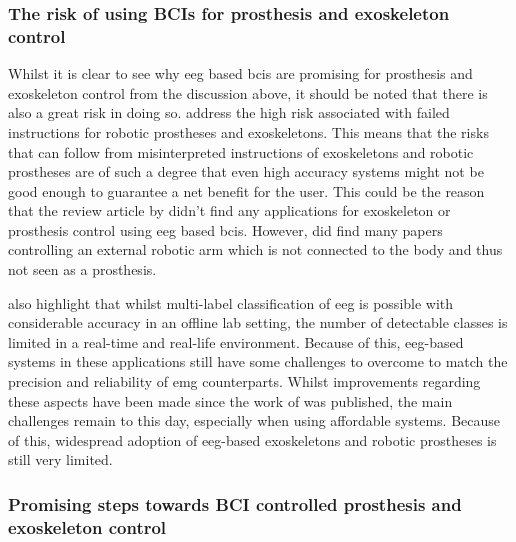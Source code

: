 
\subsubsection{The risk of using BCIs for prosthesis and exoskeleton control}
\label{subsubsec:bci_common_use_cases_prosthesis_exoskeleton_risk}

Whilst it is clear to see why \gls{eeg} based \glspl{bci} are promising for prosthesis and exoskeleton control from the discussion above, it should be noted that there is also a great risk in doing so.
 address the high risk associated with failed instructions for robotic prostheses and exoskeletons.
This means that the risks that can follow from misinterpreted instructions of exoskeletons and robotic prostheses are of such a degree that even high accuracy systems might not be good enough to guarantee a net benefit for the user.
This could be the reason that the review article by \citet{bci_review_arnau} didn't find any  applications for exoskeleton or prosthesis control using \gls{eeg} based \glspl{bci}.
However, \citet{bci_review_arnau} did find many papers controlling an external robotic arm which is not connected to the body and thus not seen as a prosthesis.

 also highlight that whilst multi-label classification of \gls{eeg} is possible with considerable accuracy in an offline lab setting, the number of detectable classes is limited in a real-time and real-life environment.
Because of this, \gls{eeg}-based systems in these applications still have some challenges to overcome to match the precision and reliability of \gls{emg} counterparts.
Whilst improvements regarding these aspects have been made since the work of \citet{bci_prostheses} was published, the main challenges remain to this day, especially when using affordable systems.
Because of this, widespread adoption of \gls{eeg}-based exoskeletons and robotic prostheses is still very limited.



\subsubsection{Promising steps towards BCI controlled prosthesis and exoskeleton control}
\label{subsubsec:bci_common_use_cases_prosthesis_exoskeleton_promosing_steps}

